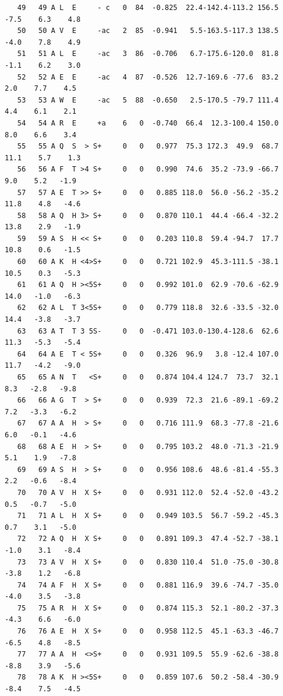 \documentclass[12pt]{article}
\begin{document}
\begin{lstlisting}
   49   49 A L  E     - c   0  84  -0.825  22.4-142.4-113.2 156.5   -7.5    6.3    4.8
   50   50 A V  E     -ac   2  85  -0.941   5.5-163.5-117.3 138.5   -4.0    7.8    4.9
   51   51 A L  E     -ac   3  86  -0.706   6.7-175.6-120.0  81.8   -1.1    6.2    3.0
   52   52 A E  E     -ac   4  87  -0.526  12.7-169.6 -77.6  83.2    2.0    7.7    4.5
   53   53 A W  E     -ac   5  88  -0.650   2.5-170.5 -79.7 111.4    4.4    6.1    2.1
   54   54 A R  E     +a    6   0  -0.740  66.4  12.3-100.4 150.0    8.0    6.6    3.4
   55   55 A Q  S  > S+     0   0   0.977  75.3 172.3  49.9  68.7   11.1    5.7    1.3
   56   56 A F  T >4 S+     0   0   0.990  74.6  35.2 -73.9 -66.7    9.0    5.2   -1.9
   57   57 A E  T >> S+     0   0   0.885 118.0  56.0 -56.2 -35.2   11.8    4.8   -4.6
   58   58 A Q  H 3> S+     0   0   0.870 110.1  44.4 -66.4 -32.2   13.8    2.9   -1.9
   59   59 A S  H << S+     0   0   0.203 110.8  59.4 -94.7  17.7   10.8    0.6   -1.5
   60   60 A K  H <4>S+     0   0   0.721 102.9  45.3-111.5 -38.1   10.5    0.3   -5.3
   61   61 A Q  H ><5S+     0   0   0.992 101.0  62.9 -70.6 -62.9   14.0   -1.0   -6.3
   62   62 A L  T 3<5S+     0   0   0.779 118.8  32.6 -33.5 -32.0   14.4   -3.8   -3.7
   63   63 A T  T 3 5S-     0   0  -0.471 103.0-130.4-128.6  62.6   11.3   -5.3   -5.4
   64   64 A E  T < 5S+     0   0   0.326  96.9   3.8 -12.4 107.0   11.7   -4.2   -9.0
   65   65 A N  T   <S+     0   0   0.874 104.4 124.7  73.7  32.1    8.3   -2.8   -9.8
   66   66 A G  T  > S+     0   0   0.939  72.3  21.6 -89.1 -69.2    7.2   -3.3   -6.2
   67   67 A A  H  > S+     0   0   0.716 111.9  68.3 -77.8 -21.6    6.0   -0.1   -4.6
   68   68 A E  H  > S+     0   0   0.795 103.2  48.0 -71.3 -21.9    5.1    1.9   -7.8
   69   69 A S  H  > S+     0   0   0.956 108.6  48.6 -81.4 -55.3    2.2   -0.6   -8.4
   70   70 A V  H  X S+     0   0   0.931 112.0  52.4 -52.0 -43.2    0.5   -0.7   -5.0
   71   71 A L  H  X S+     0   0   0.949 103.5  56.7 -59.2 -45.3    0.7    3.1   -5.0
   72   72 A Q  H  X S+     0   0   0.891 109.3  47.4 -52.7 -38.1   -1.0    3.1   -8.4
   73   73 A V  H  X S+     0   0   0.830 110.4  51.0 -75.0 -30.8   -3.8    1.2   -6.8
   74   74 A F  H  X S+     0   0   0.881 116.9  39.6 -74.7 -35.0   -4.0    3.5   -3.8
   75   75 A R  H  X S+     0   0   0.874 115.3  52.1 -80.2 -37.3   -4.3    6.6   -6.0
   76   76 A E  H  X S+     0   0   0.958 112.5  45.1 -63.3 -46.7   -6.5    4.8   -8.5
   77   77 A A  H  <>S+     0   0   0.931 109.5  55.9 -62.6 -38.8   -8.8    3.9   -5.6
   78   78 A K  H ><5S+     0   0   0.859 107.6  50.2 -58.4 -30.9   -8.4    7.5   -4.5

\end{lstlisting}
\end{document}
